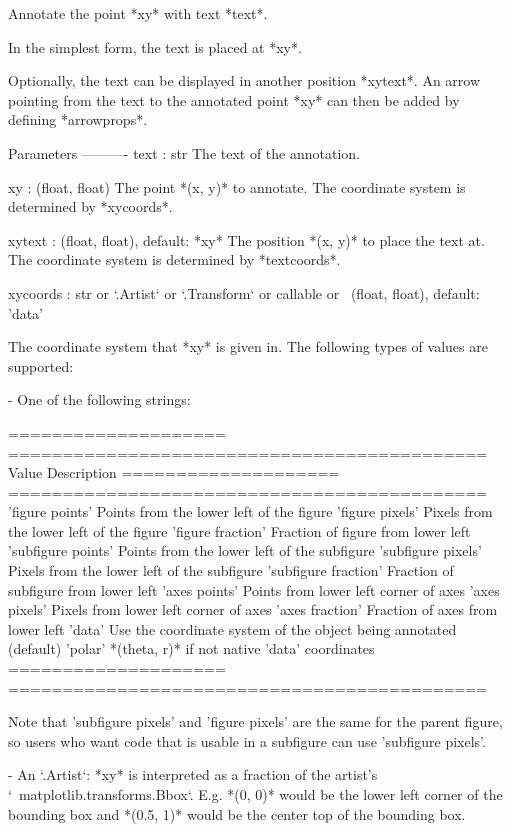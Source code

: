 \begin{DoxyVerb}Annotate the point *xy* with text *text*.

In the simplest form, the text is placed at *xy*.

Optionally, the text can be displayed in another position *xytext*.
An arrow pointing from the text to the annotated point *xy* can then
be added by defining *arrowprops*.

Parameters
----------
text : str
    The text of the annotation.

xy : (float, float)
    The point *(x, y)* to annotate. The coordinate system is determined
    by *xycoords*.

xytext : (float, float), default: *xy*
    The position *(x, y)* to place the text at. The coordinate system
    is determined by *textcoords*.

xycoords : str or `.Artist` or `.Transform` or callable or \
(float, float), default: 'data'

    The coordinate system that *xy* is given in. The following types
    of values are supported:

    - One of the following strings:

      ==================== ============================================
      Value                Description
      ==================== ============================================
      'figure points'      Points from the lower left of the figure
      'figure pixels'      Pixels from the lower left of the figure
      'figure fraction'    Fraction of figure from lower left
      'subfigure points'   Points from the lower left of the subfigure
      'subfigure pixels'   Pixels from the lower left of the subfigure
      'subfigure fraction' Fraction of subfigure from lower left
      'axes points'        Points from lower left corner of axes
      'axes pixels'        Pixels from lower left corner of axes
      'axes fraction'      Fraction of axes from lower left
      'data'               Use the coordinate system of the object
                   being annotated (default)
      'polar'              *(theta, r)* if not native 'data'
                   coordinates
      ==================== ============================================

      Note that 'subfigure pixels' and 'figure pixels' are the same
      for the parent figure, so users who want code that is usable in
      a subfigure can use 'subfigure pixels'.

    - An `.Artist`: *xy* is interpreted as a fraction of the artist's
      `~matplotlib.transforms.Bbox`. E.g. *(0, 0)* would be the lower
      left corner of the bounding box and *(0.5, 1)* would be the
      center top of the bounding box.


\end{DoxyVerb}
